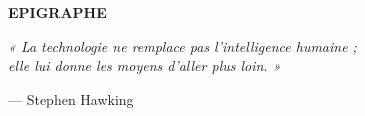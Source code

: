 \cleardoublepage

\begin{center}
	{\Large \textbf{EPIGRAPHE}}
\end{center}

\vspace*{4cm}

\begin{flushright}
	\textit{%
		« La technologie ne remplace pas l'intelligence humaine ;\\
		elle lui donne les moyens d'aller plus loin. »
	}
	
	\vspace{0.5cm}
	
	--- Stephen Hawking
\end{flushright}

\cleardoublepage